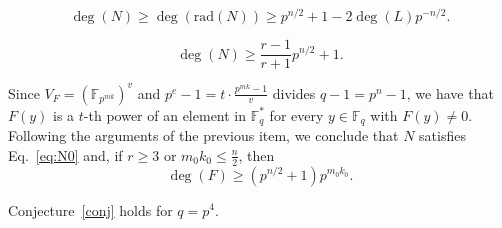 \documentclass[10pt,a4paper]{amsart}
\newcommand{\F}{\mathbb{F}}
\newcommand{\rad}{\mathrm{rad}}
\begin{document}
\begin{equation}\label{rad1}
\deg(N)\geq \deg(\rad(N))\ge p^{n/2}+1-2\deg(L) p^{-n/2}.
\end{equation}

\begin{equation}\label{eq:N0}
\deg(N)\ge\frac{r-1}{r+1}p^{n/2}+1.
\end{equation}

Since  $V_F=\left(\F_{p^{mk}}\right)^v$ and $p^e-1=t\cdot \frac{p^{mk}-1}{v}$ divides $q-1=p^n-1$, we have that $F(y)$ is a $t$-th power of an element in $\F_q^*$ for every $y\in \F_q$ with $F(y)\ne 0$. Following the arguments of the previous item, we conclude that $N$ satisfies Eq.~\eqref{eq:N0} and, if $r\ge 3$ or $m_0k_0\le \frac{n}{2}$, then \begin{equation}\label{eq:low}\deg(F)\ge (p^{n/2}+1)p^{m_0k_0}.\end{equation} 

\begin{theorem}\label{thm:p4-a}
 Conjecture~\ref{conj} holds for $q=p^4$. 
\end{theorem}
\end{document}
